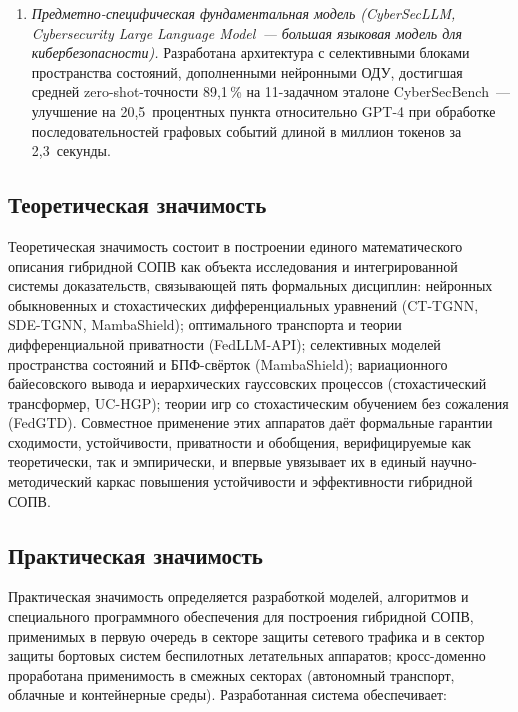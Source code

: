 \documentclass[12pt,a5paper]{article}
\begin{document}
\begin{enumerate}
\item \textit{Предметно-специфическая фундаментальная
модель (CyberSecLLM, \emph{Cybersecurity Large Language
Model}~--- большая языковая модель для кибербезопасности).}
Разработана архитектура с селективными блоками пространства
состояний, дополненными нейронными ОДУ, достигшая средней
zero-shot-точности 89,1\,\% на 11-задачном эталоне
CyberSecBench~--- улучшение на 20,5~процентных пункта
относительно GPT-4 при обработке последовательностей
графовых событий длиной в миллион токенов за 2,3~секунды.
\end{enumerate}

\subsection*{Теоретическая значимость}

Теоретическая значимость состоит в построении единого
математического описания гибридной СОПВ как объекта
исследования и интегрированной системы доказательств,
связывающей пять формальных дисциплин: нейронных
обыкновенных и стохастических дифференциальных уравнений
(CT-TGNN, SDE-TGNN, MambaShield); оптимального транспорта и
теории дифференциальной приватности (FedLLM-API);
селективных моделей пространства состояний и БПФ-свёрток
(MambaShield); вариационного байесовского вывода и
иерархических гауссовских процессов (стохастический
трансформер, UC-HGP); теории игр со стохастическим обучением
без сожаления (FedGTD). Совместное применение этих
аппаратов даёт формальные гарантии сходимости, устойчивости,
приватности и обобщения, верифицируемые как теоретически,
так и эмпирически, и впервые увязывает их в единый
научно-методический каркас повышения устойчивости и
эффективности гибридной СОПВ.

\subsection*{Практическая значимость}

Практическая значимость определяется разработкой моделей,
алгоритмов и специального программного обеспечения для
построения гибридной СОПВ, применимых в первую очередь в
секторе защиты сетевого трафика и в сектор защиты бортовых
систем беспилотных летательных аппаратов; кросс-доменно
проработана применимость в смежных секторах
(автономный транспорт, облачные и контейнерные среды).
Разработанная система обеспечивает:
\end{document}
